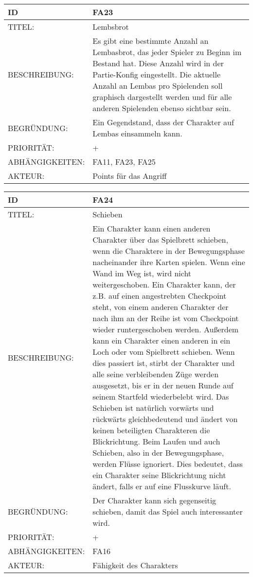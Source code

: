 \documentclass{uulm-assignment}
\begin{document}
    \begin{tabularx}{\textwidth}{|l|X |} \hline
        \textbf{ID} & \textbf{FA23} \\
        \hline
        TITEL: &  Lembsbrot\\
        \hline
        BESCHREIBUNG: & Es gibt eine bestimmte Anzahl an Lembasbrot, das jeder Spieler zu Beginn im Bestand hat. Diese Anzahl wird in der Partie-Konfig eingestellt. Die aktuelle Anzahl an Lembas pro Spielenden soll graphisch dargestellt werden und für alle anderen Spielenden ebenso sichtbar sein.
        \\
        \hline
        BEGRÜNDUNG: & Ein Gegendstand, dass der Charakter auf Lembas einsammeln kann.\\
        \hline
        PRIORITÄT: & +\\
        \hline
        ABHÄNGIGKEITEN: & FA11, FA23, FA25\\
        \hline
        AKTEUR: & Points für das Angriff\\
        \hline
    \end{tabularx}
    
    \begin{tabularx}{\textwidth}{|l|X |} \hline
        \textbf{ID} & \textbf{FA24} \\
        \hline
        TITEL: &  Schieben\\
        \hline
        BESCHREIBUNG: & Ein Charakter kann einen anderen Charakter über das Spielbrett schieben, wenn die Charaktere in der Bewegungsphase nacheinander ihre Karten spielen. Wenn eine Wand im Weg ist, wird nicht weitergeschoben. Ein Charakter kann, der z.B. auf einen angestrebten Checkpoint steht, von einem anderen Charakter der nach ihm an der Reihe ist vom Checkpoint wieder runtergeschoben werden. \newline Außerdem kann ein Charakter einen anderen in ein Loch oder vom Spielbrett schieben. Wenn dies passiert ist, stirbt der Charakter und alle seine verbleibenden Züge
werden ausgesetzt, bis er in der neuen Runde auf seinem Startfeld wiederbelebt wird. Das Schieben
ist natürlich vorwärts und rückwärts gleichbedeutend und ändert von keinen beteiligten Charakteren
die Blickrichtung. Beim Laufen und auch Schieben, also in der Bewegungsphase, werden Flüsse ignoriert. Dies bedeutet,
dass ein Charakter seine Blickrichtung nicht ändert, falls er auf eine Flusskurve läuft.
        \\
        \hline
        BEGRÜNDUNG: & Der Charakter kann sich gegenseitig schieben, damit das Spiel auch interessanter wird. \\
        \hline
        PRIORITÄT: & +\\
        \hline
        ABHÄNGIGKEITEN: & FA16\\
        \hline
        AKTEUR: & Fähigkeit des Charakters\\
        \hline
    \end{tabularx}
    
\end{document}
